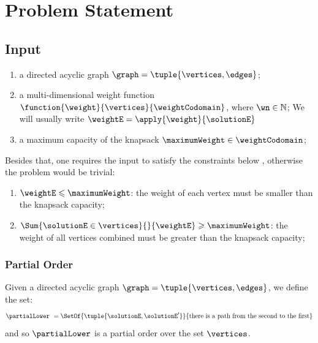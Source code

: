 \section{Problem Statement}

\subsection{Input}

\begin{enumerate}
    \item a directed acyclic graph $\graph = \tuple{\vertices,\edges}$;
    \item a multi-dimensional weight function $\function{\weight}{\vertices}{\weightCodomain}$, where $\wn \in \natural$;
        \subitem We will usually write $\weightE = \apply{\weight}{\solutionE}$
    \item a maximum capacity of the knapsack $\maximumWeight \in \weightCodomain$;
\end{enumerate}

Besides that, one requires the input to satisfy the constraints below \cite{bib:constrained-knapsack}, otherwise the problem would be trivial:

\begin{enumerate}
    \item $\weightE \leqslant \maximumWeight$: the weight of each vertex must be smaller than the knapsack capacity;
    \item $\Sum{\solutionE \in \vertices}{}{\weightE} \geqslant \maximumWeight$: the weight of all vertices combined must be greater than the knapsack capacity;
\end{enumerate}

\subsubsection{Partial Order}

\begin{defn}
    Given a directed acyclic graph $\graph = \tuple{\vertices,\edges}$, we define the set:
    \begin{equation}
        \partialLower
        \ =
        \SetOf
            {\tuple{\solutionE, \solutionE'}}
            {\mbox{there is a path from the second to the first}}
    \end{equation}
    and so $\partialLower$ is a partial order over the set $\vertices$.
\end{defn}

